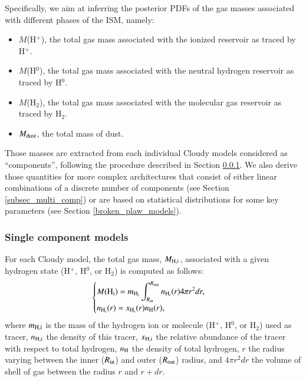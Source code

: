 \documentclass{aa}
\begin{document}
Specifically, we aim at inferring the posterior PDFs of the gas masses associated with different phases of the ISM, namely:
\begin{itemize}
    \item $M$(H$^+$), the total gas mass associated with the ionized reservoir as traced by H$^{+}$.
    \item $M$(H$^0$),  the total gas mass associated with the neutral hydrogen reservoir as traced by H$^0$.
    \item $M$(H$_2$),  the total gas mass associated with the molecular gas reservoir as traced by H$_2$.
    \item $M_{\rm dust}$, the total mass of dust.
\end{itemize}

Those masses are extracted from each individual Cloudy models considered as “components”, following the procedure described in Section \ref{subsect_single_comp}. We also derive those quantities for more complex architectures that consist of either linear combinations of a discrete number of components (see Section \ref{subsec_multi_comp}) or are based on statistical distributions for some key parameters (see Section \ref{broken_plaw_models}).

\subsubsection{Single component models}
\label{subsect_single_comp}
For each Cloudy model, the total gas mass, $M_{\rm H,i}$, associated with a given hydrogen state (H$^+$, H$^0$, or H$_2$) is computed as follows:
\begin{equation}
    \label{eq_masses}
    \begin{cases}
    \displaystyle M({\rm H_i}) = m_{\rm H_i} \int_{R_{\rm in}}^{R_{\rm out}} n_{\rm H_i}(r) 4\pi r^2 dr, \\
    \displaystyle n_{\rm H_i}(r) = x_{\rm H_i}(r) n_{\rm H}(r),
    \end{cases}    
\end{equation}
where $m_{\rm H,i}$ is the mass of the hydrogen ion or molecule (H$^+$, H$^0$, or H$_2$) used as tracer, $n_{\rm H,i}$ the density of this tracer, $x_{\rm H,i}$ the relative abundance of the tracer with respect to total hydrogen, $n_{\rm H}$ the density of total hydrogen, $r$ the radius varying between the inner ($R_{\rm in}$) and outer ($R_{\rm out}$) radius, and $4\pi r^2 dr$ the volume of shell of gas between the radius $r$ and $r+dr$.
\end{document}
